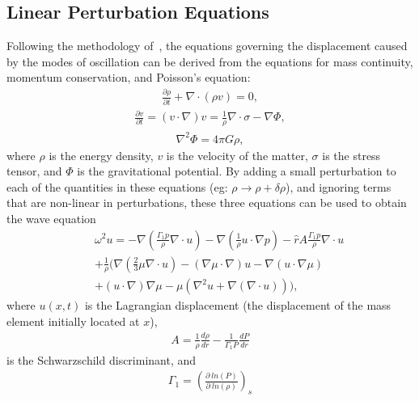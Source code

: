 \documentclass[fleqn,usenatbib]{mnras}
\begin{document}
\subsection{Linear Perturbation Equations}
\hspace{\parindent}Following the methodology of~\cite{mcdermott1988nonradial}, the equations governing the displacement caused by the modes of oscillation can be derived from the equations for mass continuity, momentum conservation, and Poisson's equation:
\begin{align}
\frac{\partial\rho}{\partial t}+\nabla\cdot(\rho v)=0,
\label{eq:continuity_eqn}
\end{align}
\begin{align}
\frac{\partial v}{\partial t}=(v\cdot \nabla)v=\frac{1}{\rho}\nabla\cdot\sigma-\nabla\Phi,
\label{eq:momentum_eqn}
\end{align}
\begin{align}
\nabla^2\Phi=4\pi G\rho,
\label{eq:Poisson_eqn}
\end{align}
\noindent where $\rho$ is the energy density, $v$ is the velocity of the matter, $\sigma$ is the stress tensor, and $\Phi$ is the gravitational potential. By adding a small perturbation to each of the quantities in these equations (eg: $\rho\rightarrow\rho+\delta\rho$), and ignoring terms that are non-linear in perturbations, these three equations can be used to obtain the wave equation
\begin{align}\nonumber
&&\omega^2u=-\nabla\left(\frac{\Gamma_1 p}{\rho}\nabla\cdot u\right)-\nabla\left(\frac{1}{\rho}u\cdot\nabla p\right)-\hat{r}A\frac{\Gamma_1 p}{\rho}\nabla\cdot u\\\nonumber
&&+\frac{1}{\rho}\biggr(\nabla\left(\frac{2}{3}\mu\nabla\cdot u\right)-\left(\nabla\mu\cdot\nabla\right)u-\nabla\left(u\cdot\nabla\mu\right)\\
&&+\left(u\cdot\nabla\right)\nabla\mu-\mu\left(\nabla^2 u+\nabla\left(\nabla\cdot u\right)\right)\biggr),
\label{eq:wave_eqn}
\end{align}
where $u(x,t)$ is the Lagrangian displacement (the displacement of the mass element initially located at $x$),
\begin{align}
A=\frac{1}{\rho}\frac{d\rho}{dr}-\frac{1}{\Gamma_1P}\frac{dP}{dr}
\label{eq:schwartz_descrim}
\end{align}
\noindent is the Schwarzschild discriminant, and
\begin{align}
\Gamma_1=\left(\frac{\partial\:ln(P)}{\partial\:ln(\rho)}\right)_s
\label{eq:adiabatic_index}
\end{align}
\end{document}
